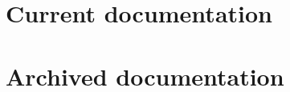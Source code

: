 \documentclass[a4paper,titlepage,12pt]{scrbook}
\begin{document}


\frontmatter
\tableofcontents
\mainmatter

\part{Current documentation}








\part{Archived documentation}












%
%
%
%
%
%
%
%
%
%
%
\printindex  %
\end{document}
